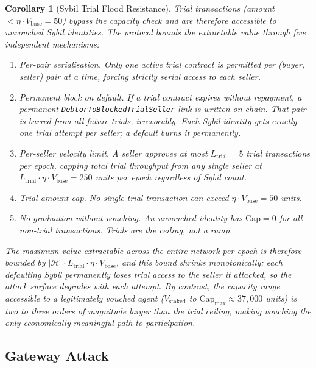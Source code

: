 \documentclass[11pt]{article}
\newtheorem{corollary}[theorem]{Corollary}
\begin{document}
\begin{corollary}[Sybil Trial Flood Resistance]
Trial transactions (amount $< \eta \cdot V_{\text{base}} = 50$) bypass the capacity check and are therefore accessible to unvouched Sybil identities. The protocol bounds the extractable value through five independent mechanisms:

\begin{enumerate}
    \item \emph{Per-pair serialisation.} Only one active trial contract is permitted per (buyer, seller) pair at a time, forcing strictly serial access to each seller.
    \item \emph{Permanent block on default.} If a trial contract expires without repayment, a permanent \texttt{DebtorToBlockedTrialSeller} link is written on-chain. That pair is barred from all future trials, irrevocably. Each Sybil identity gets exactly one trial attempt per seller; a default burns it permanently.
    \item \emph{Per-seller velocity limit.} A seller approves at most $L_{\text{trial}} = 5$ trial transactions per epoch, capping total trial throughput from any single seller at $L_{\text{trial}} \cdot \eta \cdot V_{\text{base}} = 250$ units per epoch regardless of Sybil count.
    \item \emph{Trial amount cap.} No single trial transaction can exceed $\eta \cdot V_{\text{base}} = 50$ units.
    \item \emph{No graduation without vouching.} An unvouched identity has $\text{Cap} = 0$ for all non-trial transactions. Trials are the ceiling, not a ramp.
\end{enumerate}

The maximum value extractable across the entire network per epoch is therefore bounded by $|\mathcal{H}| \cdot L_{\text{trial}} \cdot \eta \cdot V_{\text{base}}$, and this bound \emph{shrinks monotonically}: each defaulting Sybil permanently loses trial access to the seller it attacked, so the attack surface degrades with each attempt. By contrast, the capacity range accessible to a legitimately vouched agent ($V_{\text{staked}}$ to $\text{Cap}_{\max} \approx 37{,}000$ units) is two to three orders of magnitude larger than the trial ceiling, making vouching the only economically meaningful path to participation.
\end{corollary}

\subsection{Gateway Attack}
\end{document}
